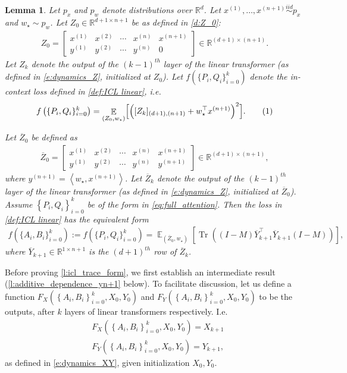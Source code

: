 \documentclass{article}
\DeclareMathOperator{\E}{\mathbb{E}}
\newcommand{\R}{\mathbb{R}}
\newtheorem{lemma}{Lemma}
\newcommand{\wstar}{w_\star}
\newcommand{\tx}[1]{x^{(#1)}}
\newcommand{\ty}[1]{y^{(#1)}}
\DeclareMathOperator{\tr}{Tr}
\newcommand*\lin[1]{\left\langle #1 \right\rangle}
\newcommand*\lrb[1]{\left[ #1 \right]}
\newcommand*\lrp[1]{\left( #1 \right)}
\newcommand*\lrbb[1]{\left\{ #1 \right\}}
\newcommand\numberthis{\addtocounter{equation}{1}\tag{\theequation}}
\begin{document}
\begin{lemma}
\label{l:icl_trace_form}
Let $p_x$ and $p_w$ denote distributions over $\R^d$. Let $\tx{1},\dots,\tx{n+1} \overset{iid}{\sim} p_x$ and $\wstar \sim p_w$. Let $Z_0\in \R^{d+1\times n+1}$ be as defined in \eqref{d:Z_0}: 
\begin{align*}
Z_0 = \begin{bmatrix}
\tx{1} & \tx{2} & \cdots & \tx{n} &\tx{n+1} \\ 
\ty{1} & \ty{2} & \cdots &\ty{n}& 0
\end{bmatrix} \in \R^{(d+1) \times (n+1)}.
\end{align*}
Let $Z_k$ denote the output of the $(k-1)^{th}$ layer of the linear transformer (as defined in \eqref{e:dynamics_Z}, initialized at $Z_0$). Let $f\left(\{P_i, Q_i\}^{k}_{i=0}\right)$ denote the in-context loss defined in \eqref{def:ICL linear}, i.e.
\begin{align*}
f\left(\{P_i, Q_i\}^{k}_{i=0}\right) = \E_{(Z_0,\wstar)} \Bigl[ \left( [Z_{k}]_{(d+1),(n+1)} + \wstar^\top \tx{n+1}  \right)^2\Bigr].
\numberthis \label{e:old_icl}
\end{align*}

Let $\overline{Z}_0$ be defined as 
\begin{align*}
\overline{Z}_0 = \begin{bmatrix}
\tx{1} & \tx{2} & \cdots & \tx{n} &\tx{n+1} \\ 
\ty{1} & \ty{2} & \cdots &\ty{n}& \ty{n+1}
\end{bmatrix} \in \R^{(d+1) \times (n+1)},
\end{align*}
where $\ty{n+1} = \lin{\wstar, \tx{n+1}}$. Let $\overline{Z}_k$ denote the output of the $(k-1)^{th}$ layer of the linear transformer (as defined in \eqref{e:dynamics_Z}, initialized at $\overline{Z}_0$). Assume $\lrbb{P_i,Q_i}_{i=0}^k$ be of the form in \eqref{eq:full_attention}. Then the loss in \eqref{def:ICL linear} has the equivalent form
\begin{align*}
f\left(\{A_i, B_i\}^{k}_{i=0}\right) := f\left(\{P_i, Q_i\}^{k}_{i=0}\right) = \E_{(\overline{Z}_0,\wstar)} \lrb{\tr\lrp{\lrp{I-M}\overline{Y}_{k+1}^\top \overline{Y}_{k+1}\lrp{I-M}}},
\end{align*}
where $\overline{Y}_{k+1}\in\R^{1\times n+1}$ is the $(d+1)^{th}$ row of $\overline{Z}_k$.

\end{lemma}


Before proving \autoref{l:icl_trace_form}, we first establish an intermediate result (\autoref{l:additive_dependence_yn+1} below). To facilitate discussion, let us define a function $F_{X}\lrp{\lrbb{A_i,B_i}_{i=0}^k, X_0,Y_0}$ and $F_{Y}\lrp{\lrbb{A_i,B_i}_{i=0}^k, X_0,Y_0}$ to be the outputs, after $k$ layers of linear transformers respectively. I.e.
\begin{align*}
& F_{X}\lrp{\lrbb{A_i,B_i}_{i=0}^k, X_0,Y_0} = X_{k+1}\\
& F_{Y}\lrp{\lrbb{A_i,B_i}_{i=0}^k, X_0,Y_0} = Y_{k+1},
\end{align*}
as defined in \eqref{e:dynamics_XY}, given initialization $X_0,Y_0$.
\end{document}
